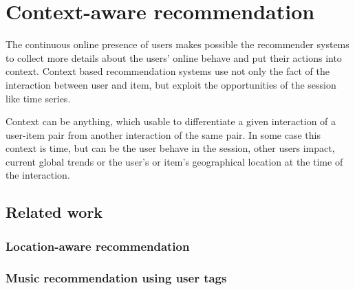\chapter{Context-aware recommendation}\label{ch:context}
The continuous online presence of users makes possible the recommender systems to 
collect  more details about the users' online behave and put their actions into 
context. Context based recommendation systems use not only the fact of the interaction between 
user and item, but exploit the opportunities of the session like  time series. 

Context can be anything, which usable to differentiate a given interaction of a user-item pair \cite{adomavicius2011context}
from another interaction of the same pair. In some case this context is time, but can be the 
user behave in the session, other users impact, current global trends or the user's or item's
geographical location at the time of the interaction.

\section{Related work}

\subsection{Location-aware recommendation}

\subsection{Music recommendation using user tags}








